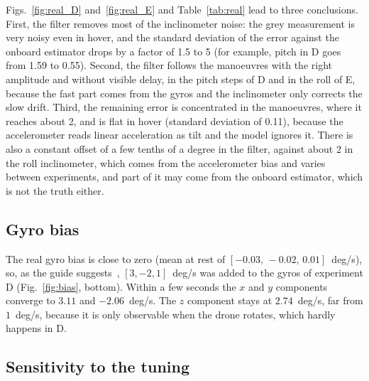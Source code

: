 \documentclass[11pt,a4paper]{article}
\begin{document}
Figs.~\ref{fig:real_D} and~\ref{fig:real_E} and Table~\ref{tab:real} lead to three conclusions.
First, the filter removes most of the inclinometer noise: the grey measurement is very noisy even in hover, and the standard deviation of the error against the onboard estimator drops by a factor of 1.5 to 5 (for example, pitch in D goes from 1.59\textdegree{} to 0.55\textdegree).
Second, the filter follows the manoeuvres with the right amplitude and without visible delay, in the pitch steps of D and in the roll of E, because the fast part comes from the gyros and the inclinometer only corrects the slow drift.
Third, the remaining error is concentrated in the manoeuvres, where it reaches about 2\textdegree, and is flat in hover (standard deviation of 0.11\textdegree), because the accelerometer reads linear acceleration as tilt and the model ignores it.
There is also a constant offset of a few tenths of a degree in the filter, against about 2\textdegree{} in the roll inclinometer, which comes from the accelerometer bias and varies between experiments, and part of it may come from the onboard estimator, which is not the truth either.

\subsection{Gyro bias}

The real gyro bias is close to zero (mean at rest of $[-0.03,\,-0.02,\,0.01]$~deg/s), so, as the guide suggests~\cite{guia}, $[3,-2,1]$~deg/s was added to the gyros of experiment D (Fig.~\ref{fig:bias}, bottom).
Within a few seconds the $x$ and $y$ components converge to $3.11$ and $-2.06$~deg/s.
The $z$ component stays at $2.74$~deg/s, far from $1$~deg/s, because it is only observable when the drone rotates, which hardly happens in D.

\subsection{Sensitivity to the tuning}
\label{sec:sens}
\end{document}
